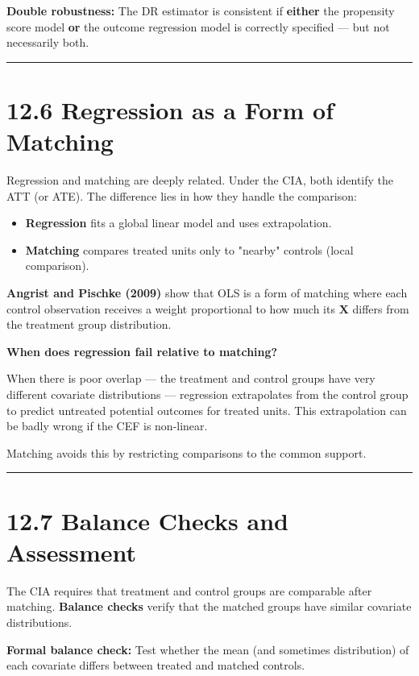 \textbf{Double robustness:} The DR estimator is consistent if \textbf{either} the propensity score model \textbf{or} the outcome regression model is correctly specified --- but not necessarily both.

\medskip\hrule\medskip

\section{12.6 Regression as a Form of Matching}

Regression and matching are deeply related. Under the CIA, both identify the ATT (or ATE). The difference lies in how they handle the comparison:

\begin{itemize}
\item \textbf{Regression} fits a global linear model and uses extrapolation.
\item \textbf{Matching} compares treated units only to "nearby" controls (local comparison).
\end{itemize}

\textbf{Angrist and Pischke (2009)} show that OLS is a form of matching where each control observation receives a weight proportional to how much its $\mathbf{X}$ differs from the treatment group distribution.

\textbf{When does regression fail relative to matching?}

When there is poor overlap --- the treatment and control groups have very different covariate distributions --- regression extrapolates from the control group to predict untreated potential outcomes for treated units. This extrapolation can be badly wrong if the CEF is non-linear.

Matching avoids this by restricting comparisons to the common support.

\medskip\hrule\medskip

\section{12.7 Balance Checks and Assessment}

The CIA requires that treatment and control groups are comparable after matching. \textbf{Balance checks} verify that the matched groups have similar covariate distributions.

\textbf{Formal balance check:} Test whether the mean (and sometimes distribution) of each covariate differs between treated and matched controls.

